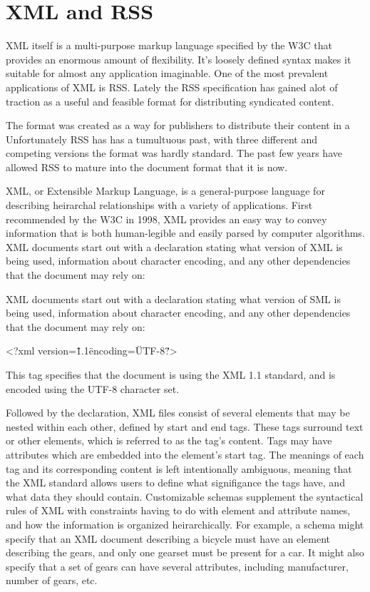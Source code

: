\documentclass[a4paper,12pt]{report}
\begin{document}
\section{XML and RSS}
XML itself is a multi-purpose markup language specified by the W3C that provides an enormous amount of flexibility.
It's loosely defined syntax makes it suitable for almost any application imaginable.
One of the most prevalent applications of XML is RSS.
Lately the RSS specification has gained alot of traction as a useful and feasible format for distributing syndicated content.

The format was created as a way for publishers to distribute their content in a 
Unfortunately RSS has has a tumultuous past, with three different and competing versions the format was hardly standard.
The past few years have allowed RSS to mature into the document format that it is now.

XML, or Extensible Markup Language, is a general-purpose language for describing heirarchal relationships with a variety of applications. 
First recommended by the W3C in 1998, XML provides an easy way to convey information that is both human-legible and easily parsed by computer algorithms. 
XML documents start out with a declaration stating what version of XML is being used, information about character encoding, and any other dependencies that the document may rely on:

XML documents start out with a declaration stating what version of SML is being used, information about character encoding, and any other dependencies that the document may rely on:

<?xml version=\"1.1\" encoding=\"UTF-8\"?>

This tag specifies that the document is using the XML 1.1 standard, and is encoded using the UTF-8 character set.

Followed by the declaration, XML files consist of several elements that may be nested within each other, defined by start and end tags.
These tags surround text or other elements, which is referred to as the tag's content.
Tags may have attributes which are embedded into the element's start tag. 
The meanings of each tag and its corresponding content is left intentionally ambiguous, meaning that the XML standard allows users to define what signifigance the tags have, and what data they should contain. 
Customizable schemas supplement the syntactical rules of XML with constraints having to do with element and attribute names, and how the information is organized heirarchically. 
For example, a schema might specify that an XML document describing a bicycle must have an element describing the gears, and only one gearset must be present for a car. 
It might also specify that a set of gears can have several attributes, including manufacturer, number of gears, etc. 
\end{document}
